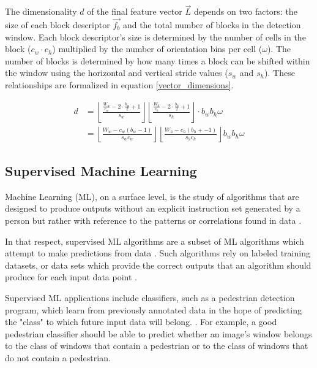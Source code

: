 The dimensionality $d$ of the final feature vector $\vec{L}$ depends on two factors: the size of each block descriptor $\vec{f_b}$ and the total number of blocks in the detection window. Each block descriptor's size is determined by the number of cells in the block ($c_w\cdot c_h$) multiplied by the number of orientation bins per cell ($\omega$). The number of blocks is determined by how many times a block can be shifted within the window using the horizontal and vertical stride values ($s_w$ and $s_h$). These relationships are formalized in equation \ref{vector_dimensions}.

\begin{equation}
    \label{vector_dimensions}
    \begin{split}
    d &= \left\lfloor \frac{\frac{W_w}{c_w}-2\cdot\frac{b_w}{2}+1}{s_w} \right\rfloor\left\lfloor \frac{\frac{W_h}{c_h}-2\cdot\frac{b_h}{2}+1}{s_h} \right\rfloor\cdot b_w b_h\omega \\ &= \left\lfloor  \frac{W_w- c_w(b_w-1)}{s_w c_w}  \right\rfloor \left\lfloor   \frac{W_h -c_h(b_h +-1)}{s_h c_h} \right\rfloor b_w b_h\omega
    \end{split}
\end{equation}

\subsection{Supervised Machine Learning}\label{sec:supervised_ml}

Machine Learning (ML), on a surface level, is the study of algorithms that are designed to produce outputs without an explicit instruction set generated by a person but rather with reference to the patterns or correlations found in data \cite{what_is_ml}. 

In that respect, supervised ML algorithms are a subset of ML algorithms which attempt to make predictions from data \cite{supervised_learning}. Such algorithms rely on labeled training datasets, or data sets which provide the correct outputs that an algorithm should produce for each input data point \cite {supervised_learning}. 

Supervised ML applications include classifiers, such as a pedestrian detection program, which learn from previously annotated data in the hope of predicting the "class" to which future input data will belong. \cite{derek_2020_svm}. For example, a good pedestrian classifier should be able to predict whether an image's window belongs to the class of windows that contain a pedestrian or to the class of windows that do not contain a pedestrian.

